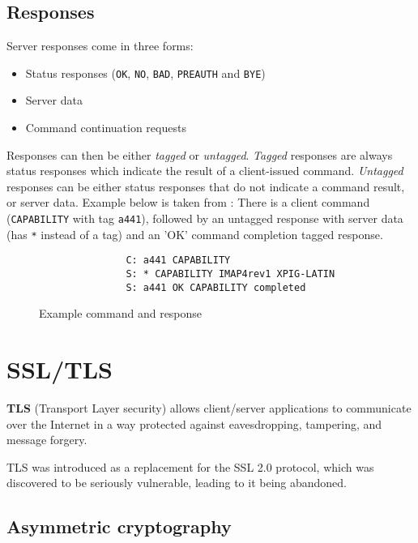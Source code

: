 \documentclass[a4]{report}
\begin{document}
\subsection{Responses}

Server responses come in three forms:

\begin{itemize}
  \item Status responses (\texttt{OK}, \texttt{NO}, \texttt{BAD}, \texttt{PREAUTH} and \texttt{BYE})
  \item Server data
  \item Command continuation requests
\end{itemize}

Responses can then be either \textit{tagged} or \textit{untagged}. \textit{Tagged} responses are always status responses which indicate the result of a client-issued command. \textit{Untagged} responses can be either status responses that do not indicate a command result, or server data. Example below is taken from \cite{rfc3501}: There is a client command (\texttt{CAPABILITY} with tag \texttt{a441}), followed by an untagged response with server data (has \texttt{*} instead of a tag) and an 'OK' command completion tagged response.

\begin{figure}[h]
  \centering
  \begin{verbatim}
               C: a441 CAPABILITY
               S: * CAPABILITY IMAP4rev1 XPIG-LATIN
               S: a441 OK CAPABILITY completed
  \end{verbatim}
  \caption{Example command and response}
\end{figure}

\section{SSL/TLS}

\textbf{TLS} (Transport Layer security) allows client/server applications to communicate over the Internet in a way protected against eavesdropping, tampering, and message forgery\cite{rfc8446}.

TLS was introduced as a replacement for the SSL 2.0 protocol, which was discovered to be seriously vulnerable, leading to it being abandoned\cite{rfc6176}.

\subsection{Asymmetric cryptography}
\end{document}
